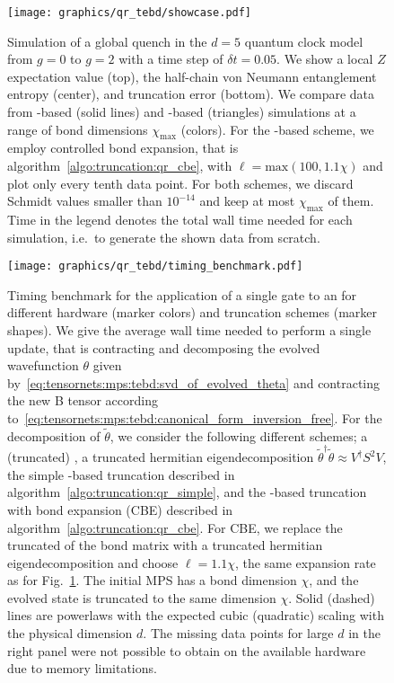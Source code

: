 \begin{figure}
    \centering
    \texttt{[image: graphics/qr\_tebd/showcase.pdf]}
    \caption[
        -based TEBD simulation of the quantum clock model.
    ]{
         Simulation of a global quench in the $d=5$ quantum clock model from $g=0$ to $g=2$ with a time step of $\delta t = 0.05$.
        We show a local $Z$ expectation value (top), the half-chain von Neumann entanglement entropy (center), and truncation error (bottom).
        We compare data from -based (solid lines) and -based (triangles)  simulations at a range of bond dimensions $\chi_\mathrm{max}$ (colors). 
        For the -based scheme, we employ controlled bond expansion, that is algorithm~\ref{algo:truncation:qr_cbe}, with $\ell = \mathrm{max}(100, 1.1\chi)$ and plot only every tenth data point.
        For both schemes, we discard Schmidt values smaller than $10^{-14}$ and keep at most $\chi_\mathrm{max}$ of them.
        Time in the legend denotes the total wall time needed for each simulation, i.e.~to generate the shown data from scratch.
    }
    \label{fig:truncation:benchmark:showcase}
\end{figure}


\begin{figure}
    \centering
    \texttt{[image: graphics/qr\_tebd/timing\_benchmark.pdf]}
    \caption[
        Timing benchmark for gate application in QR-based TEBD.
    ]{
        Timing benchmark for the application of a single gate to an  for different hardware (marker colors) and truncation schemes (marker shapes).
        We give the average wall time needed to perform a single  update, that is contracting and decomposing the evolved wavefunction $\theta$ given by~\eqref{eq:tensornets:mps:tebd:svd_of_evolved_theta} and contracting the new B tensor according to~\eqref{eq:tensornets:mps:tebd:canonical_form_inversion_free}.
        For the decomposition of $\tilde\theta$, we consider the following different schemes; a (truncated) , a truncated hermitian eigendecomposition $\tilde\theta^\dagger\tilde\theta \approx V^\dagger S^2 V$, the simple -based truncation described in algorithm~\ref{algo:truncation:qr_simple}, and the -based truncation with bond expansion (CBE) described in algorithm~\ref{algo:truncation:qr_cbe}.
        For CBE, we replace the truncated  of the bond matrix with a truncated hermitian eigendecomposition and choose $\ell = 1.1 \chi$, the same expansion rate as for Fig.~\ref{fig:truncation:benchmark:showcase}.
        The initial MPS has a bond dimension $\chi$, and the evolved state is truncated to the same dimension $\chi$.
        Solid (dashed) lines are powerlaws with the expected cubic (quadratic) scaling with the physical dimension $d$.
        The missing data points for large $d$ in the right panel were not possible to obtain on the available hardware due to memory limitations.
    }
    \label{fig:truncation:benchmark:timing_benchmark}
\end{figure}


